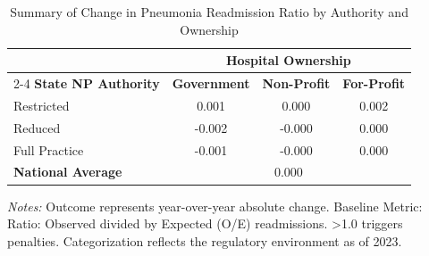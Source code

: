 \begin{table}[htbp]
    \centering
    \caption{Summary of Change in Pneumonia Readmission Ratio by Authority and Ownership}
    \label{tab:d_rrp_excess_ratio_pn_own}
    \vspace{0.2cm}
    \begin{tabular}{lccc}
        \toprule
        & \multicolumn{3}{c}{\textbf{Hospital Ownership}} \\
        \cmidrule(lr){2-4}
        \textbf{State NP Authority} & \textbf{Government} & \textbf{Non-Profit} & \textbf{For-Profit} \\
        \midrule
        Restricted & 0.001 & 0.000 & 0.002 \\
        Reduced & -0.002 & -0.000 & 0.000 \\
        Full Practice & -0.001 & -0.000 & 0.000 \\
        \midrule
        \textbf{National Average} & \multicolumn{3}{c}{0.000} \\
        \bottomrule
    \end{tabular}
    \vspace{0.1cm}
    \begin{minipage}{0.85\textwidth}
        \footnotesize \textit{Notes:} Outcome represents year-over-year absolute change. Baseline Metric: Ratio: Observed divided by Expected (O/E) readmissions. >1.0 triggers penalties. Categorization reflects the regulatory environment as of 2023.
    \end{minipage}
\end{table}